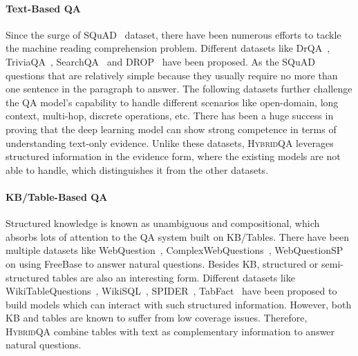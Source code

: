 \documentclass[11pt,a4paper]{article}
\newcommand{\dataset}{\textsc{HybridQA}\xspace}
\begin{document}
\paragraph{Text-Based QA} Since the surge of SQuAD~\cite{rajpurkar2016squad} dataset, there have been numerous efforts to tackle the machine reading comprehension problem. Different datasets like DrQA~\cite{chen2017reading}, TriviaQA~\cite{joshi2017triviaqa}, SearchQA~\cite{dunn2017searchqa} and DROP~\cite{dua2019drop} have been proposed. As the SQuAD~\cite{rajpurkar2016squad} questions that are relatively simple because they usually require no more than one sentence in the paragraph to answer. The following datasets further challenge the QA model's capability to handle different scenarios like open-domain, long context, multi-hop, discrete operations, etc. There has been a huge success in proving that the deep learning model can show strong competence in terms of understanding text-only evidence. Unlike these datasets, \dataset leverages structured information in the evidence form, where the existing models are not able to handle, which distinguishes it from the other datasets.

\paragraph{KB/Table-Based QA} Structured knowledge is known as unambiguous and compositional, which absorbs lots of attention to the QA system built on KB/Tables. There have been multiple datasets like WebQuestion~\cite{berant2013semantic}, ComplexWebQuestions~\cite{talmor2018web}, WebQuestionSP~\cite{yih2015semantic} on using FreeBase to answer natural questions. Besides KB, structured or semi-structured tables are also an interesting form. Different datasets like WikiTableQuestions~\cite{pasupat2015compositional}, WikiSQL~\cite{zhong2017seq2sql}, SPIDER~\cite{yu2018spider}, TabFact~\cite{2019TabFactA} have been proposed to build models which can interact with such structured information. However, both KB and tables are known to suffer from low coverage issues. Therefore, \dataset combine tables with text as complementary information to answer natural questions.  
\end{document}
